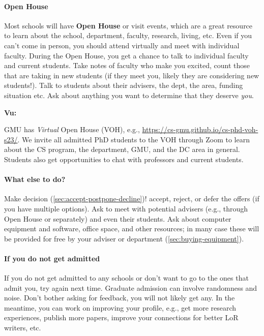 \documentclass[oneside,11pt]{book}
\newenvironment{commentbox}[1][]{
  \small
  \begin{mybox}
    {\small \textbf{#1}}
  }{
  \end{mybox}
}
\begin{document}
\paragraph{Open House} Most schools will have \textbf{Open House} or visit events, which are a great resource to learn about the school, department, faculty, research, living, etc. Even if you can't come in person, you should attend virtually and meet with individual faculty.
During the Open House, you get a chance to talk to individual faculty and current students.  Take notes of faculty who make you excited, count those that are taking in new students (if they meet you, likely they are considering new students!).  Talk to students about their advisers, the dept, the area, funding situation etc.  Ask about anything you want to determine that they deserve \emph{you}.

\begin{commentbox}[Vu:]
  GMU has \emph{Virtual} Open House (VOH), e.g., \url{https://cs-gmu.github.io/cs-phd-voh-s23/}. We invite all admitted PhD students to the VOH through Zoom to learn about the CS program, the department, GMU, and the DC area in general. Students also get opportunities to chat with professors and current students.
\end{commentbox}

\paragraph{What else to do?} Make decision (\autoref{sec:accept-postpone-decline})! accept, reject, or defer the offers (if you have multiple options). Ask to meet with potential advisers (e.g., through Open House or separately) and even their students. Ask about computer equipment and software, office space, and other resources; in many case these will be provided for free by your adviser or department (\autoref{sec:buying-equipment}).

\paragraph{If you do not get admitted} If you do not get admitted to any schools or don't want to go to the ones that admit you, try again next time.  Graduate admission can involve randomness and noise.  Don't bother asking for feedback, you will not likely get any.  In the meantime, you can work on improving your profile, e.g., get more research experiences, publish more papers, improve your connections for better LoR writers, etc.
\end{document}
